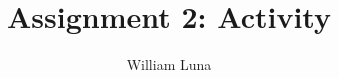 \documentclass[
	letterpaper, %
]{jdf}
\author{William Luna}
\title{Assignment 2: Activity}
\begin{document}
\newcommand{\pcite}[1]{(\cite{#1})}

\maketitle



\end{document}
